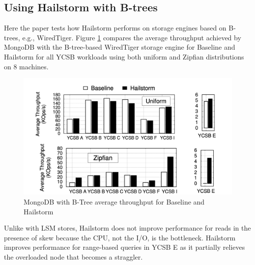 \documentclass[a4paper,10pt,twoside]{article}
\begin{document}
\subsection{Using Hailstorm with B-trees}
Here the paper tests how Hailstorm performs on storage engines based on B-trees, e.g., WiredTiger\cite{wiredtiger}.
Figure \ref{fig:mesh9} compares the average throughput achieved by MongoDB with the B-tree-based WiredTiger storage engine for Baseline and Hailstorm for all YCSB workloads using both uniform and Zipfian distributions on 8 machines. 
\begin{figure}[h]
    \centering
	\includegraphics[scale=0.3]{B-tree eva.png}
    \caption{MongoDB with B-Tree average throughput for Baseline and Hailstorm \cite{mainpaper}}
    \label{fig:mesh9}
\end{figure}
Unlike with LSM stores, Hailstorm does not improve performance for reads in the presence of skew because the CPU, not the I/O, is the bottleneck. 
Hailstorm improves performance for range-based queries in YCSB E as it partially relieves the overloaded node that becomes a straggler.
\end{document}
